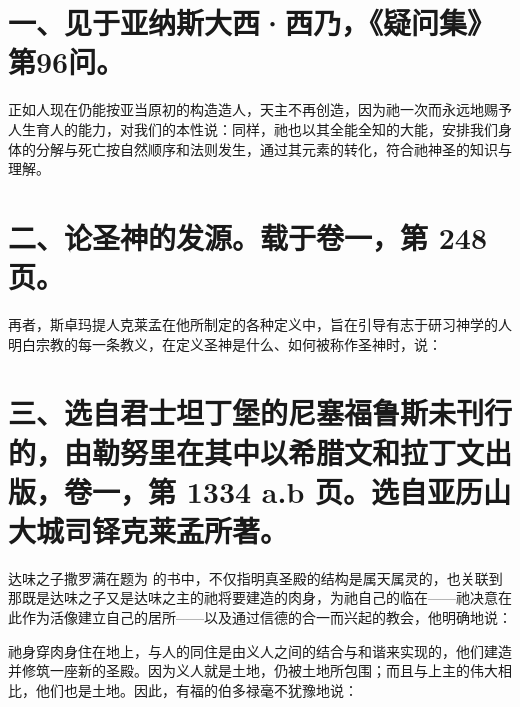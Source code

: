 
\section{一、见于亚纳斯大西·西乃，《疑问集》第96问。}

正如人现在仍能按亚当原初的构造造人，天主不再创造，因为祂一次而永远地赐予人生育人的能力，对我们的本性说：同样，祂也以其全能全知的大能，安排我们身体的分解与死亡按自然顺序和法则发生，通过其元素的转化，符合祂神圣的知识与理解。\par


\section{二、论圣神的发源。载于卷一，第 248 页。}

再者，斯卓玛提人克莱孟在他所制定的各种定义中，旨在引导有志于研习神学的人明白宗教的每一条教义，在定义圣神是什么、如何被称作圣神时，说：\par


\section{三、选自君士坦丁堡的尼塞福鲁斯未刊行的，由勒努里在其中以希腊文和拉丁文出版，卷一，第 1334 a.b 页。选自亚历山大城司铎克莱孟所著。}

达味之子撒罗满在题为  的书中，不仅指明真圣殿的结构是属天属灵的，也关联到那既是达味之子又是达味之主的祂将要建造的肉身，为祂自己的临在——祂决意在此作为活像建立自己的居所——以及通过信德的合一而兴起的教会，他明确地说：\par

祂身穿肉身住在地上，与人的同住是由义人之间的结合与和谐来实现的，他们建造并修筑一座新的圣殿。因为义人就是土地，仍被土地所包围；而且与上主的伟大相比，他们也是土地。因此，有福的伯多禄毫不犹豫地说：\par

